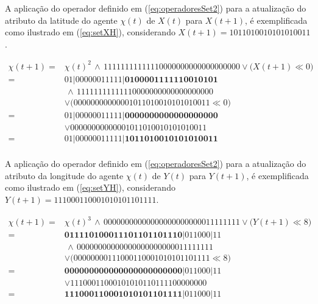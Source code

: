 A aplicação do operador definido em (\ref{eq:operadoresSet2}) para a atualização do atributo da latitude do agente $\chi(t)$ de $X(t)$ para $X(t + 1)$, é exemplificada como ilustrado em (\ref{eq:setXH}), considerando $X(t + 1) = 1 0 1 1 0 1 0 0 1 0 1 0 1 0 1 0 0 1 1$.

\begin{equation}
 \begin{split}
 \chi(t + 1)   = & \chi(t)^2 \, \wedge \, 11111111111110000000000000000000 \vee \big(X(t + 1) \ll 0\big) \\
	       = & 0 1 | 0 0 0 0 0 0 1 1 1 1 1 | \boldsymbol{0 1 0 0 0 0 1 1 1 1 1 1 0 0 1 0 1 0 1} \\
	         & \, \wedge \, 11111111111110000000000000000000 \\
	         & \vee \big(00000000000001011010010101010011 \ll 0\big) \\
	       = & 0 1 | 0 0 0 0 0 0 1 1 1 1 1 | \boldsymbol{0 0 0 0 0 0 0 0 0 0 0 0 0 0 0 0 0 0 0} \\
	         & \vee 00000000000001011010010101010011 \\
	       = & 0 1 | 0 0 0 0 0 0 1 1 1 1 1 | \boldsymbol{1 0 1 1 0 1 0 0 1 0 1 0 1 0 1 0 0 1 1} \\
 \label{eq:setXH}
 \end{split}
\end{equation}

A aplicação do operador definido em (\ref{eq:operadoresSet2}) para a atualização do atributo da longitude do agente $\chi(t)$ de $Y(t)$ para $Y(t + 1)$, é exemplificada como ilustrado em (\ref{eq:setYH}), considerando $Y(t + 1) = 1 1 1 0 0 0 1 1 0 0 0 1 0 1 0 1 0 1 1 0 1 1 1 1$.

\begin{equation}
 \begin{split}
 \chi(t + 1)   = & \chi(t)^3 \, \wedge \, 00000000000000000000000011111111 \vee \big(Y(t + 1) \ll 8\big) \\
	       = & \boldsymbol{0 1 1 1 1 0 1 0 0 0 1 1 1 0 1 1 0 1 1 0 1 1 1 0} | 0 1 1 0 0 0 | 1 1 \\
	         & \, \wedge \, 00000000000000000000000011111111 \\
	         & \vee \big(00000000111000110001010101101111 \ll 8\big) \\
	       = & \boldsymbol{0 0 0 0 0 0 0 0 0 0 0 0 0 0 0 0 0 0 0 0 0 0 0 0} | 0 1 1 0 0 0 | 1 1 \\
	         & \vee 11100011000101010110111100000000 \\
	       = & \boldsymbol{1 1 1 0 0 0 1 1 0 0 0 1 0 1 0 1 0 1 1 0 1 1 1 1} | 0 1 1 0 0 0 | 1 1 \\
 \label{eq:setYH}
 \end{split}
\end{equation}

